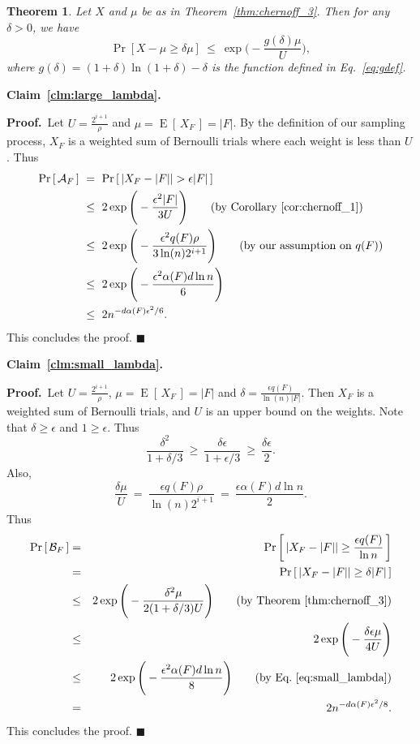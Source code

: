\documentclass[11pt]{article}
\newcommand{\proofbelow}{8pt}
\numberwithin{equation}{section}
\newtheorem{theorem}{Theorem}[section]
\renewenvironment{proof}{\noindent\textbf{Proof.}\,}{\afterproof}
\newcommand{\afterproof}{\hfill $\blacksquare$ \par \vspace{\proofbelow}}
\newcommand{\repeatclaim}[2]{\vspace{6pt}\noindent\textbf{#1. }{\it #2} \vspace{6pt}}
\newcommand{\cA}{\mathcal{A}}
\newcommand{\cB}{\mathcal{B}}
\newcommand{\prob}[1]{\operatorname{Pr}\left[\,#1\,\right]}               \newcommand{\probg}[2]{\operatorname{Pr}\left[\,#1 \:\mid\: #2\,\right]}
\newcommand{\expect}[1]{\operatorname{E}\left[\,#1\,\right]}              \newcommand{\expectg}[2]{\operatorname{E}\left[\,#1 \,\mid\, #2\,\right]}
\newcommand{\Claim}[1]{Claim~\ref{clm:#1}}
\newcommand{\Corollary}[1]{Corollary~\ref{cor:#1}}
\newcommand{\EquationName}[1]{\label{eq:#1}}
\newcommand{\Equation}[1]{Eq.~\eqref{eq:#1}}
\newcommand{\TheoremName}[1]{\label{thm:#1}}
\newcommand{\Theorem}[1]{Theorem~\ref{thm:#1}}
\begin{document}
\begin{theorem}
\TheoremName{chernoff_4}
Let $X$ and $\mu$ be as in \Theorem{chernoff_3}.
Then for any $\delta > 0$, we have
$$
    \Pr[X-\mu\ge \delta\mu] ~\le~ \exp\Bigg(-\frac{g(\delta)\mu}{U} \Bigg),
$$
where $g(\delta) = (1+\delta) \ln( 1+\delta ) - \delta$ is the function defined in \Equation{gdef}.
\end{theorem}


\repeatclaim{\Claim{large_lambda}}{\clmlargelambda}

\begin{proof}
Let $U = \frac{2^{i+1}}{\rho}$ and $\mu=\expect{X_F}=|F|$.
By the definition of our sampling process,
$X_F$ is a weighted sum of Bernoulli trials where each weight is less than $U$.
Thus
\begin{align*}
\prob{\cA_F}
    &~=~ \prob{|X_F-|F|| > \epsilon |F|} \\
    &~\le~ 2\exp\Bigg(-\frac{\epsilon^2|F|}{3 U}\Bigg)
        \qquad\text{(by \Corollary{chernoff_1})}\\
    &~\leq~ 2\exp\Bigg(- \frac{\epsilon^2 q(F) \rho}{3 \ln(n) 2^{i+1}} \Bigg)
        \qquad\text{(by our assumption on $q(F)$)}\\
    &~\leq~ 2\exp\Bigg(- \frac{\epsilon^2 \alpha(F) d \ln n}{6} \Bigg) \\
    &~\le~ 2n^{-d\alpha(F)\epsilon^2/6}.
\end{align*}
This concludes the proof.
\end{proof}

\repeatclaim{\Claim{small_lambda}}{\clmsmalllambda}

\begin{proof}
Let $U = \frac{2^{i+1}}{\rho}$, $\mu=\expect{X_F}=|F|$
and $\delta=\frac{\epsilon q(F)}{\ln(n) |F|}$.
Then $X_F$ is a weighted sum of Bernoulli trials, and $U$ is an upper bound on the weights.
Note that $\delta \ge \epsilon$ and $1 \geq \epsilon$.
Thus
$$
    \frac{\delta^2}{1+\delta/3}
        ~\ge~ \frac{\delta\epsilon}{1+\epsilon/3}
        ~\ge~ \frac{\delta\epsilon}{2}.
$$
Also, 
\begin{equation}
 \EquationName{small_lambda}
    \frac{\delta\mu}{U} 
         ~=~ \frac{\epsilon q(F) \rho}{\ln(n) 2^{i+1}}
         ~=~ \frac{\epsilon \alpha(F) d \ln n}{2}.
\end{equation}
Thus
\begin{eqnarray*}
\prob{\cB_F} &=& \prob{ |X_F-|F|| \ge \frac{\epsilon q(F)}{\ln n} } \\
&=& \prob{|X_F-|F|| \ge \delta |F|} \\
&\le& 2\exp\Bigg(-\frac{\delta^2\mu}{2(1+\delta/3)U}\Bigg)
    \qquad\text{(by \Theorem{chernoff_3})}\\
&\le& 2\exp\Bigg(-\frac{\delta\epsilon\mu}{4 U}\Bigg) \\
&\le& 2\exp\Bigg(-\frac{\epsilon^2\alpha(F) d \ln n}{8}\Bigg)
    \qquad\text{(by \Equation{small_lambda})}\\
&=& 2n^{-d\alpha(F) \epsilon^2/8}.
\end{eqnarray*}
This concludes the proof.
\end{proof}
\end{document}
